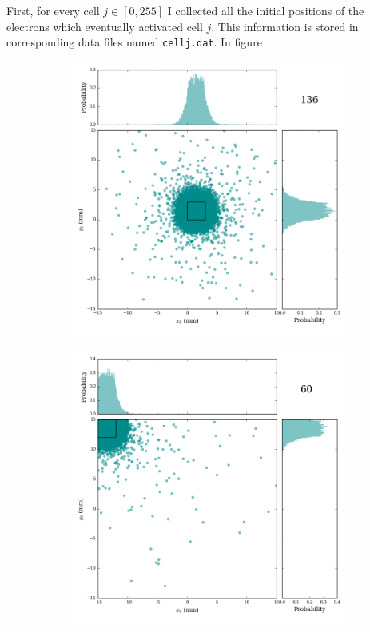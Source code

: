 \documentclass[12pt]{article}
\begin{document}
\noindent First, for every cell $j \in [0,255]$ I collected all the initial positions of the electrons which eventually activated cell $j$. This information is stored in corresponding data files named \texttt{cellj.dat}. In figure

\begin{figure}
\centering
\begin{subfigure}{.5\textwidth}
  \centering
  \includegraphics[width=\linewidth]{../figures/cellfigs/cell136.png}
  \label{fig:sub1}
\end{subfigure}%
\begin{subfigure}{.5\textwidth}
  \centering
  \includegraphics[width=\linewidth]{../figures/cellfigs/cell60.png}
  \label{fig:sub2}
\end{subfigure}
\label{fig:test}


\end{figure}
\end{document}
